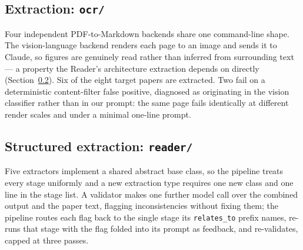 \documentclass[10pt,twocolumn]{article}
\begin{document}
\subsection{Extraction: \texttt{ocr/}}

Four independent PDF-to-Markdown backends share one command-line shape. The
vision-language backend renders each page to an image and sends it to Claude, so figures
are genuinely read rather than inferred from surrounding text --- a property the Reader's
architecture extraction depends on directly (Section~\ref{sec:reader}). Six of the eight
target papers are extracted. Two fail on a deterministic content-filter false positive,
diagnosed as originating in the vision classifier rather than in our prompt: the same
page fails identically at different render scales and under a minimal one-line prompt.

\subsection{Structured extraction: \texttt{reader/}}
\label{sec:reader}

Five extractors implement a shared abstract base class, so the pipeline treats every
stage uniformly and a new extraction type requires one new class and one line in the
stage list. A validator makes one further model call over the combined output and the
paper text, flagging inconsistencies without fixing them; the pipeline routes each flag
back to the single stage its \texttt{relates\_to} prefix names, re-runs that stage with
the flag folded into its prompt as feedback, and re-validates, capped at three passes.
\end{document}
